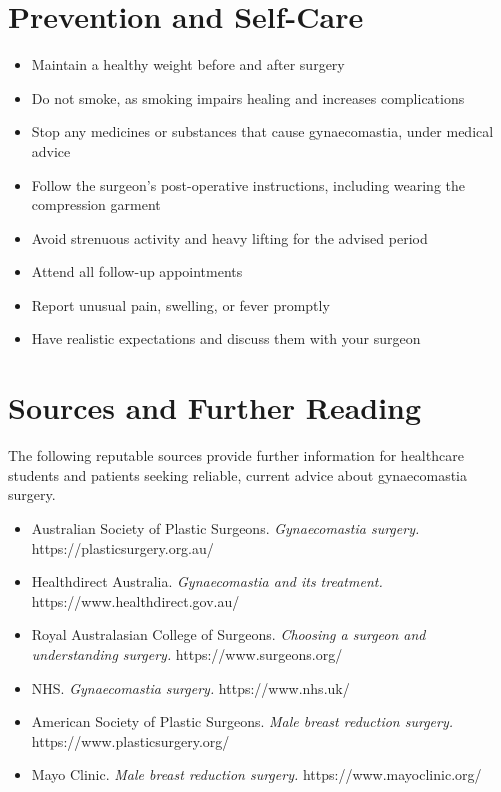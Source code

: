 \section*{Prevention and Self-Care}
\begin{itemize}
    \item Maintain a healthy weight before and after surgery
    \item Do not smoke, as smoking impairs healing and increases complications
    \item Stop any medicines or substances that cause gynaecomastia, under medical advice
    \item Follow the surgeon's post-operative instructions, including wearing the compression garment
    \item Avoid strenuous activity and heavy lifting for the advised period
    \item Attend all follow-up appointments
    \item Report unusual pain, swelling, or fever promptly
    \item Have realistic expectations and discuss them with your surgeon
\end{itemize}

\section*{Sources and Further Reading}
The following reputable sources provide further information for healthcare students and patients seeking reliable, current advice about gynaecomastia surgery.

\begin{itemize}
    \item Australian Society of Plastic Surgeons. \textit{Gynaecomastia surgery.} https://plasticsurgery.org.au/
    \item Healthdirect Australia. \textit{Gynaecomastia and its treatment.} https://www.healthdirect.gov.au/
    \item Royal Australasian College of Surgeons. \textit{Choosing a surgeon and understanding surgery.} https://www.surgeons.org/
    \item NHS. \textit{Gynaecomastia surgery.} https://www.nhs.uk/
    \item American Society of Plastic Surgeons. \textit{Male breast reduction surgery.} https://www.plasticsurgery.org/
    \item Mayo Clinic. \textit{Male breast reduction surgery.} https://www.mayoclinic.org/
\end{itemize}
